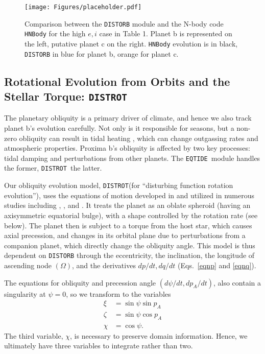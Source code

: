 \documentclass[preprint,12pt]{aastex}
\def\distorb{\texttt{\footnotesize{DISTORB}}\xspace}
\def\distrot{\texttt{\footnotesize{DISTROT}}\xspace}
\def\eqtide{\texttt{\footnotesize{EQTIDE}}\xspace}
\begin{document}
\begin{figure}
\texttt{[image: Figures/placeholder.pdf]}
\caption{Comparison between the \distorb module and the N-body code
  {\footnotesize \texttt{HNBody}} for the high $e,i$ case in Table 1.
  Planet b is represented on the left, putative planet c on the
  right. {\footnotesize \texttt{HNBody}} evolution is in black,
  \distorb in blue for planet b, orange for planet c.}
\label{fig:orbitvalid}
\end{figure} 

\subsection{Rotational Evolution from Orbits and the Stellar Torque: \distrot}
\label{sec:models:distrot}
The planetary obliquity is a primary driver of climate, and hence we
also track planet b's evolution carefully. Not only is it responsible
for seasons, but a non-zero obliquity can result in tidal heating
\citep{Heller11}, which can change outgassing rates and atmospheric
properties. Proxima b's obliquity is affected by two key processes:
tidal damping and perturbations from other planets. The \eqtide~module
handles the former, \distrot~the latter.

Our obliquity evolution model, \distrot (for ``disturbing function
rotation evolution''), uses the equations of motion developed in
\cite{Kinoshita1975, Kinoshita1977} and utilized in numerous studies
including \cite{Laskar1986}, \cite{Laskar1993a,Laskar1993b}, and
\cite{Armstrong14}.  It treats the planet as an oblate spheroid
(having an axisymmetric equatorial bulge), with a shape controlled by
the rotation rate (see below). The planet then is subject to a torque
from the host star, which causes axial precession, and changes in its
orbital plane due to perturbations from a companion planet, which
directly change the obliquity angle.  This model is thus dependent on
\distorb through the eccentricity, the inclination, the longitude of
ascending node $(\Omega)$, and the derivatives $dp/dt, dq/dt$
(Eqs.~\ref{eqnp} and \ref{eqnq}).

The equations for obliquity and precession angle $(d\psi/dt,
dp_A/dt)$, also contain a singularity at $\psi = 0$, so we transform
to the variables
\begin{align}
\xi & = \sin{\psi} \sin{p_A} \\
\zeta & = \sin{\psi} \cos{p_A} \\
\chi & = \cos{\psi}.
\end{align}
The third variable, $\chi$, is necessary to preserve domain
information. Hence, we ultimately have three variables to integrate
rather than two.
\end{document}
